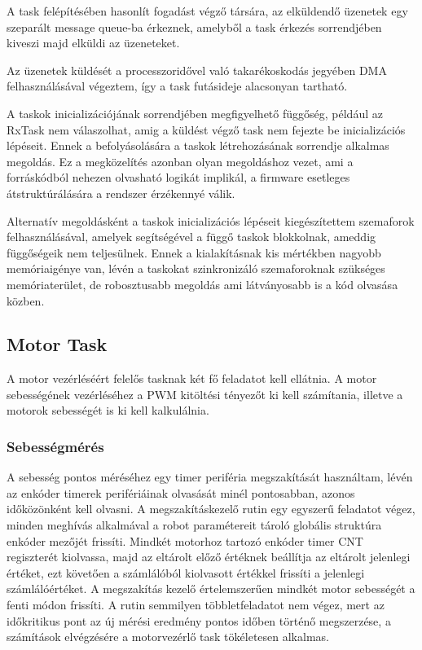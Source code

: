 A task felépítésében hasonlít fogadást végző társára, az elküldendő üzenetek egy
szeparált message queue-ba érkeznek, amelyből a task érkezés sorrendjében kiveszi
majd elküldi az üzeneteket.

Az üzenetek küldését a processzoridővel való takarékoskodás jegyében DMA
felhasználásával végeztem, így a task futásideje alacsonyan tartható. 

\medskip

A taskok inicializációjának sorrendjében megfigyelhető függőség, például az
RxTask nem válaszolhat, amig a küldést végző task nem fejezte be inicializációs
lépéseit. Ennek a befolyásolására a taskok létrehozásának sorrendje alkalmas
megoldás. Ez a megközelítés azonban olyan megoldáshoz vezet, ami a forráskódból
nehezen olvasható logikát implikál, a firmware esetleges átstruktúrálására a
rendszer érzékennyé válik.

Alternatív megoldásként a taskok inicializációs lépéseit kiegészítettem
szemaforok felhasználásával, amelyek segítségével a függő taskok blokkolnak,
ameddig függőségeik nem teljesülnek. Ennek a kialakításnak kis mértékben nagyobb
memóriaigénye van, lévén a taskokat szinkronizáló szemaforoknak szükséges
memóriaterület, de robosztusabb megoldás ami látványosabb is a kód olvasása
közben.

\subsection{Motor Task}

A motor vezérléséért felelős tasknak két fő feladatot kell ellátnia. A motor
sebességének vezérléséhez a PWM kitöltési tényezőt ki kell számítania, illetve a
motorok sebességét is ki kell kalkulálnia.

\subsubsection{Sebességmérés}

A sebesség pontos méréséhez egy timer periféria megszakítását használtam, lévén
az enkóder timerek perifériáinak olvasását minél pontosabban, azonos időközönként
kell olvasni. A megszakításkezelő rutin egy egyszerű feladatot végez, minden
meghívás alkalmával a robot paramétereit tároló globális struktúra enkóder
mezőjét frissíti. Mindkét motorhoz tartozó enkóder timer CNT  regiszterét
kiolvassa, majd az eltárolt előző értéknek beállítja az eltárolt jelenlegi
értéket, ezt követően a számlálóból kiolvasott értékkel frissíti a jelenlegi
számlálóértéket. A megszakítás kezelő értelemszerűen mindkét motor sebességét a
fenti módon frissíti. A rutin semmilyen többletfeladatot nem végez, mert az
időkritikus pont az új mérési eredmény pontos időben történő megszerzése, a
számítások elvégzésére a motorvezérlő task tökéletesen alkalmas.

